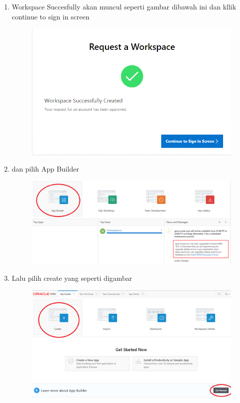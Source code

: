 \begin{enumerate}
	\item Workspace Succesfully akan muncul seperti gambar dibawah ini dan kllik continue to sign in screen
	\begin{figure} [!htbp]
	\includegraphics[scale=0.2]{Apex/11.png}
	\centering
	\end{figure}
	
	\item dan pilih App Builder
	\begin{figure} [!htbp]
	\includegraphics[scale=0.2]{Apex/13.png}
	\centering
	\end{figure}
	
	\item Lalu pilih create yang seperti digambar 
	\begin{figure} [!htbp]
	\includegraphics[scale=0.2]{Apex/14.png}
	\centering
	\end{figure}
	

\end{enumerate}
